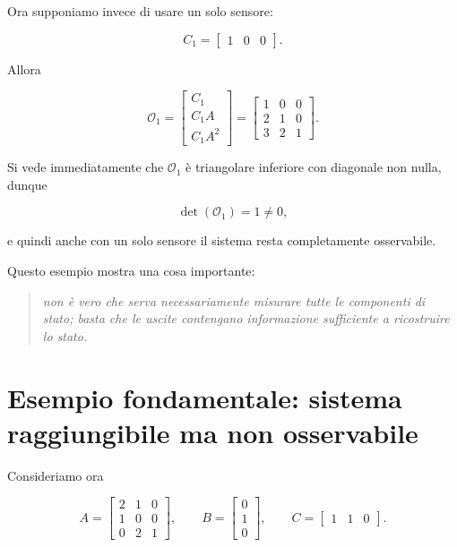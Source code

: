 \medskip

Ora supponiamo invece di usare un solo sensore:

\[
C_1=
\begin{bmatrix}
1 & 0 & 0
\end{bmatrix}.
\]

Allora

\[
\mathcal O_1=
\begin{bmatrix}
C_1\\
C_1A\\
C_1A^2
\end{bmatrix}
=
\begin{bmatrix}
1 & 0 & 0\\
2 & 1 & 0\\
3 & 2 & 1
\end{bmatrix}.
\]

Si vede immediatamente che \(\mathcal O_1\) è triangolare inferiore con diagonale non nulla, dunque

\[
\det(\mathcal O_1)=1\neq 0,
\]

e quindi anche con un solo sensore il sistema resta completamente osservabile.

\medskip

Questo esempio mostra una cosa importante:

\begin{quote}
\emph{non è vero che serva necessariamente misurare tutte le componenti di stato; basta che le uscite contengano informazione sufficiente a ricostruire lo stato.}
\end{quote}

\bigskip

\section{Esempio fondamentale: sistema raggiungibile ma non osservabile}

Consideriamo ora

\[
A=
\begin{bmatrix}
2 & 1 & 0\\
1 & 0 & 0\\
0 & 2 & 1
\end{bmatrix},
\qquad
B=
\begin{bmatrix}
0\\
1\\
0
\end{bmatrix},
\qquad
C=
\begin{bmatrix}
1 & 1 & 0
\end{bmatrix}.
\]

